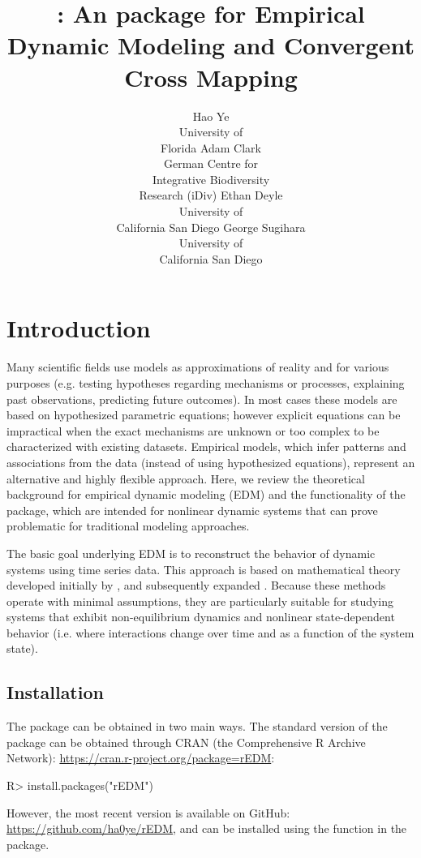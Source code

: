 \documentclass[article]{jss}
\author{Hao Ye\\University of \\Florida
   \And Adam Clark\\German Centre for \\Integrative Biodiversity \\Research (iDiv)
   \And Ethan Deyle\\University of \\California San Diego
   \And George Sugihara\\University of \\California San Diego}
\title{\pkg{rEDM}: An \proglang{R} package for Empirical Dynamic Modeling and Convergent Cross Mapping}
\begin{document}
\section{Introduction} \label{sec:intro}

Many scientific fields use models as approximations of reality and for various purposes (e.g. testing hypotheses regarding mechanisms or processes, explaining past observations, predicting future outcomes). In most cases these models are based on hypothesized parametric equations; however explicit equations can be impractical when the exact mechanisms are unknown or too complex to be characterized with existing datasets. Empirical models, which infer patterns and associations from the data (instead of using hypothesized equations), represent an alternative and highly flexible approach. Here, we review the theoretical background for empirical dynamic modeling (EDM) and the functionality of the  package, which are intended for nonlinear dynamic systems that can prove problematic for traditional modeling approaches.

The basic goal underlying EDM is to reconstruct the behavior of dynamic systems using time series data. This approach is based on mathematical theory developed initially by \citep{Takens_1981}, and subsequently expanded \citep{Sauer_1991, Casdagli_1991, Deyle_2011}. Because these methods operate with minimal assumptions, they are particularly suitable for studying systems that exhibit non-equilibrium dynamics and nonlinear state-dependent behavior (i.e. where interactions change over time and as a function of the system state).

\subsection{Installation}\label{sec:installation}

The  package can be obtained in two main ways. The standard version of the package can be obtained through CRAN (the Comprehensive R Archive Network): \url{https://cran.r-project.org/package=rEDM}:

\begin{Schunk}
\begin{Sinput}
R> install.packages("rEDM")
\end{Sinput}
\end{Schunk}

However, the most recent version is available on GitHub: \url{https://github.com/ha0ye/rEDM}, and can be installed using the  function in the  package.
\end{document}
